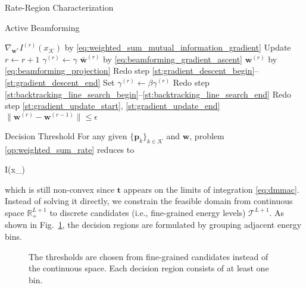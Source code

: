 \begin{section}{Rate-Region Characterization}
\begin{subsection}{Active Beamforming}
\begin{algorithm}[!t]
\begin{algorithmic}[1]
				\State \phantom{Get} $\nabla_{\mathbf{w}^*} I^{(r)}(x_{\mathcal{K}})$ by \eqref{eq:weighted_sum_mutual_information_gradient} \label{st:gradient_update_end}
				\Repeat
					\State Update $r \gets r+1$
					\State \phantom{Update} $\gamma^{(r)}\gets\gamma$
					\State \phantom{Update} $\bar{\mathbf{w}}^{(r)}$ by \eqref{eq:beamforming_gradient_ascent} \label{st:backtracking_line_search_begin}
					\State \phantom{Update} $\mathbf{w}^{(r)}$ by \eqref{eq:beamforming_projection}
					\State Redo step \ref{st:gradient_descent_begin}--\ref{st:gradient_descent_end} \label{st:backtracking_line_search_end}
						\State Set $\gamma^{(r)}\gets\beta\gamma^{(r)}$
						\State Redo step \ref{st:backtracking_line_search_begin}--\ref{st:backtracking_line_search_end}
					\EndWhile
					\State Redo step \ref{st:gradient_update_start}, \ref{st:gradient_update_end}
				\Until $\lVert\mathbf{w}^{(r)}-\mathbf{w}^{(r-1)}\rVert \le \epsilon$
			\end{algorithmic}
		\end{algorithm}
	\end{subsection}

	\begin{subsection}{Decision Threshold}
		For any given $\{\mathbf{p}_k\}_{k \in \mathcal{K}}$ and $\mathbf{w}$, problem \eqref{op:weighted_sum_rate} reduces to
		\begin{maxi!}
			{}{I(x_{})}{\label{op:decision_threshold}}{\label{ob:decision_threshold}}
			\addConstraint{\eqref{co:sequential_threshold},\eqref{co:nonnegative_threshold},}
		\end{maxi!}
		which is still non-convex since $\mathbf{t}$ appears on the limits of integration \eqref{eq:dmmac}.
		Instead of solving it directly, we constrain the feasible domain from continuous space $\mathbb{R}_+^{L+1}$ to discrete candidates (i.e., fine-grained energy levels) $\mathcal{T}^{L+1}$.
		As shown in Fig.~\ref{fg:discrete_outputs}, the decision regions are formulated by grouping adjacent energy bins.
		\begin{figure}[H]
			\centering
			\resizebox{0.9\columnwidth}{!}{
				
			}
			\caption{The thresholds are chosen from fine-grained candidates instead of the continuous space. Each decision region consists of at least one bin.}
			\label{fg:discrete_outputs}
		\end{figure}


\end{subsection}
\end{section}

